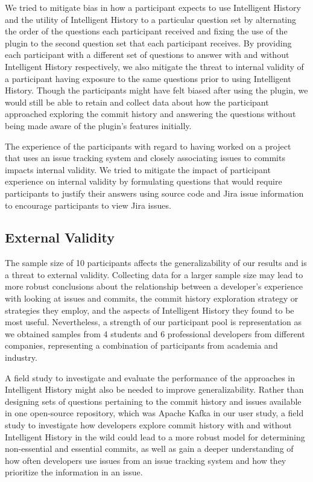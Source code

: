 We tried to mitigate bias in how a participant expects to use Intelligent History 
and the utility of Intelligent History to a particular question set 
by alternating the order of the questions each participant received 
and fixing the use of the plugin to the second question set that each participant receives.
By providing each participant with a different set of questions to answer with 
and without Intelligent History respectively,
we also mitigate the threat to internal validity of a participant having 
exposure to the same questions prior to using Intelligent History.
Though the participants might have felt biased after using the plugin,
we would still be able to retain and collect data about how the participant approached 
exploring the commit history and answering the questions without being made aware of the plugin's features initially.

The experience of the participants with regard to having worked on a project that uses an issue tracking system 
and closely associating issues to commits impacts internal validity.
We tried to mitigate the impact of participant experience on internal validity by formulating questions 
that would require participants to justify their answers using source code and Jira issue information to
encourage participants to view Jira issues.

\subsection{External Validity}

The sample size of 10 participants affects the generalizability of our results and is a threat to external validity.
Collecting data for a larger sample size may lead to more robust conclusions about the relationship 
between a developer's experience with looking at issues and commits,
the commit history exploration strategy or strategies they employ, 
and the aspects of Intelligent History they found to be most useful.
Nevertheless, a strength of our participant pool is representation as 
we obtained samples from 4 students and 6 professional developers from different companies,
representing a combination of participants from academia and industry.

A field study to investigate and evaluate the performance of the approaches in Intelligent History might also be needed to improve generalizability.
Rather than designing sets of questions pertaining to the commit history and issues available in one open-source repository,
which was Apache Kafka in our user study,
a field study to investigate how developers explore commit history with and without Intelligent History in the wild 
could lead to a more robust model for determining non-essential and essential commits,
as well as gain a deeper understanding of how often developers use issues from an issue tracking system and how they prioritize the information in an issue.

\endinput

Any text after an \endinput is ignored.
You could put scraps here or things in progress.